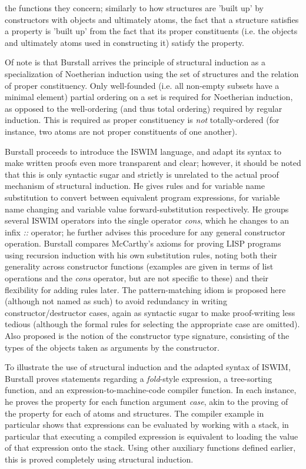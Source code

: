 \documentclass[11pt]{article}
\begin{document}
the functions they concern; similarly to how structures are 'built up' by
constructors with objects and ultimately atoms, the fact that a structure
satisfies a property is 'built up' from the fact that its proper constituents
(i.e. the objects and ultimately atoms used in constructing it) satisfy the
property.
\par
Of note is that Burstall arrives the principle of structural induction as a
specialization of Noetherian induction using the set of structures and the
relation of proper constituency. Only well-founded (i.e. all non-empty subsets
have a minimal element) partial ordering on a set is required for Noetherian
induction, as opposed to the well-ordering (and thus total ordering) required by
regular induction. This is required as proper constituency is \textit{not}
totally-ordered (for instance, two atoms are not proper constituents of one
another). 
\par
Burstall proceeds to introduce the ISWIM language, and adapt its syntax to make
written proofs even more transparent and clear; however, it should be noted that
this is only syntactic sugar and strictly is unrelated to the actual proof
mechanism of structural induction. He gives rules \textalpha{} and \textbeta{}
for variable name substitution to convert between equivalent program
expressions, for variable name changing and variable value forward-substitution
respectively. He groups several ISWIM operators into the single operator
\textit{cons}, which he changes to an infix \textit{::} operator; he further
advises this procedure for any general constructor operation. Burstall compares
McCarthy's axioms for proving LISP programs using recursion induction
\cite{mccarthy1963basis} with his own substitution rules, noting both their
generality across constructor functions (examples are given in terms of list
operations and the \textit{cons} operator, but are not specific to these) and
their flexibility for adding rules later. The pattern-matching idiom is proposed
here (although not named as such) to avoid redundancy in writing
constructor/destructor cases, again as syntactic sugar to make proof-writing
less tedious (although the formal rules for selecting the appropriate case are
omitted).  Also proposed is the notion of the constructor type signature,
consisting of the types of the objects taken as arguments by the constructor.
\par
To illustrate the use of structural induction and the adapted syntax of ISWIM,
Burstall proves statements regarding a \textit{fold}-style expression, a
tree-sorting function, and an expression-to-machine-code compiler function. In
each instance, he proves the property for each function argument \textit{case},
akin to the proving of the property for each of atoms and structures. The
compiler example in particular shows that expressions can be evaluated by
working with a stack, in particular that  executing a compiled expression is
equivalent to loading the value of that expression onto the stack. Using other
auxiliary functions defined earlier, this is proved completely using structural
induction.
\end{document}
